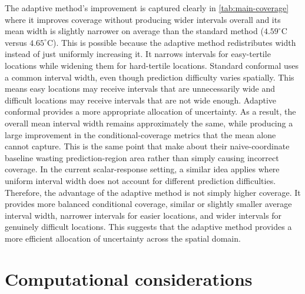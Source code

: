 \documentclass[11pt,a4paper]{report}
\begin{document}
The adaptive method's improvement is captured clearly in \cref{tab:main-coverage} where it improves coverage without producing wider intervals overall and its mean width is slightly narrower on average than the standard method ($4.59^\circ\mathrm{C}$ versus $4.65^\circ\mathrm{C}$). This is possible because the adaptive method redistributes width instead of just uniformly increasing it. It narrows intervals for easy-tertile locations while widening them for hard-tertile locations. Standard conformal uses a common interval width, even though prediction difficulty varies spatially. This means easy locations may receive intervals that are unnecessarily wide and difficult locations may receive intervals that are not wide enough. Adaptive conformal provides a more appropriate allocation of uncertainty. As a result, the overall mean interval width remains approximately the same, while producing a large improvement in the conditional-coverage metrics that the mean alone cannot capture. This is the same point that \citeauthor{amirishahbazi2026} make about their naive-coordinate baseline wasting prediction-region area rather than simply causing incorrect coverage. In the current scalar-response setting, a similar idea applies where uniform interval width does not account for different prediction difficulties. Therefore, the advantage of the adaptive method is not simply higher coverage. It provides more balanced conditional coverage, similar or slightly smaller average interval width, narrower intervals for easier locations, and wider intervals for genuinely difficult locations. This suggests that the adaptive method provides a more efficient allocation of uncertainty across the spatial domain.
 
\section{Computational considerations}
\end{document}
